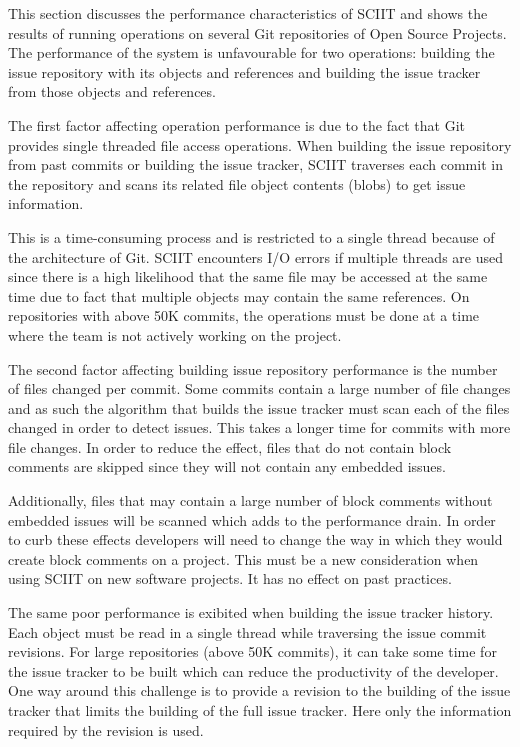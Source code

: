 \documentclass{mproj}
\begin{document}

This section discusses the performance characteristics of SCIIT and shows the results of running operations on several Git repositories of Open Source Projects. The performance of the system is unfavourable for two operations: building the issue repository with its objects and references and building the issue tracker from those objects and references. 

The first factor affecting operation performance is due to the fact that Git provides single threaded file access operations. When building the issue repository from past commits or building the issue tracker, SCIIT traverses each commit in the repository and scans its related file object contents (blobs) to get issue information. 

This is a time-consuming process and is restricted to a single thread because of the architecture of Git. SCIIT encounters I/O errors if multiple threads are used since there is a high likelihood that the same file may be accessed at the same time due to fact that multiple objects may contain the same references. On repositories with above 50K commits, the operations must be done at a time where the team is not actively working on the project.

The second factor affecting building issue repository performance is the number of files changed per commit. Some commits contain a large number of file changes and as such the algorithm that builds the issue tracker must scan each of the files changed in order to detect issues. This takes a longer time for commits with more file changes. In order to reduce the effect, files that do not contain block comments are skipped since they will not contain any embedded issues.

Additionally, files that may contain a large number of block comments without embedded issues will be scanned which adds to the performance drain. In order to curb these effects developers will need to change the way in which they would create block comments on a project. This must be a new consideration when using SCIIT on new software projects. It has no effect on past practices.


The same poor performance is exibited when building the issue tracker history. Each object must be read in a single thread while traversing the issue commit revisions. For large repositories (above 50K commits), it can take some time for the issue tracker to be built which can reduce the productivity of the developer. One way around this challenge is to provide a revision to the building of the issue tracker that limits the building of the full issue tracker. Here only the information required by the revision is used.
 
\end{document}
